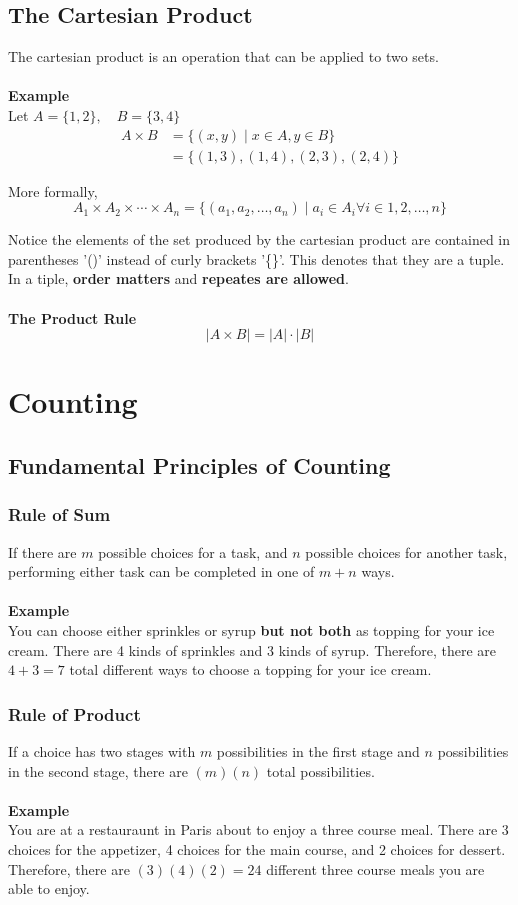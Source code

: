 \documentclass[12pt]{article}
\begin{document}
	\subsection{The Cartesian Product}
	The cartesian product is an operation that can be applied to two sets.\\\\
	\textbf{Example}\\
	Let $A = \{1, 2\},\quad B = \{3, 4\}$
	\begin{align*}
		A \times B &= \{(x, y) \mid x \in A, y \in B\} \\
		&= \{(1, 3), (1, 4), (2, 3), (2, 4)\} 
	\end{align*}

	More formally,
	$$ A_1 \times A_2 \times \cdots \times A_n = \{(a_1, a_2, \ldots, a_n) \mid a_i \in A_i \forall i \in {1, 2, \ldots, n} \} $$

	Notice the elements of the set produced by the cartesian product are contained in parentheses '()' instead of curly brackets '\{\}'. This denotes that they are a tuple. In a tiple, \textbf{order matters} and \textbf{repeates are allowed}.\\\\
	\textbf{The Product Rule} \\ 
	$$|A \times B| = |A| \cdot |B|$$

	\section{Counting}
	\subsection{Fundamental Principles of Counting}
	\subsubsection{Rule of Sum}
	If there are $m$ possible choices for a task, and $n$ possible choices for another task, performing either task can be completed in one of $m + n$ ways. \\\\
	\textbf{Example}\\
	You can choose either sprinkles or syrup \textbf{but not both} as topping for your ice cream. There are 4 kinds of sprinkles and 3 kinds of syrup. Therefore, there are $4 + 3 = 7$ total different ways to choose a topping for your ice cream.
	\subsubsection{Rule of Product}
	If a choice has two stages with $m$ possibilities in the first stage and $n$ possibilities in the second stage, there are $(m)(n)$ total possibilities.\\\\
	\textbf{Example}\\
	You are at a restauraunt in Paris about to enjoy a three course meal. There are 3 choices for the appetizer, 4 choices for the main course, and 2 choices for dessert. Therefore, there are $(3)(4)(2) = 24$ different three course meals you are able to enjoy. 
\end{document}
